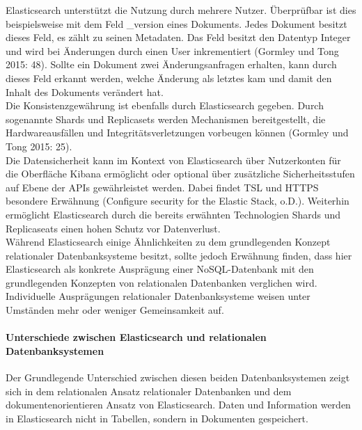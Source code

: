 \documentclass[a4paper]{scrartcl}
\begin{document}
Elasticsearch unterstützt die Nutzung durch mehrere Nutzer. Überprüfbar ist dies beispielsweise mit dem Feld \_version eines Dokuments. Jedes Dokument besitzt dieses Feld, es zählt zu seinen Metadaten. Das Feld besitzt den Datentyp Integer und wird bei Änderungen durch einen User inkrementiert (Gormley und Tong 2015: 48). Sollte ein Dokument zwei Änderungsanfragen erhalten, kann durch dieses Feld erkannt werden, welche Änderung als letztes kam und damit den Inhalt des Dokuments verändert hat. \\

Die Konsistenzgewährung ist ebenfalls durch Elasticsearch gegeben. Durch sogenannte Shards und Replicasets werden Mechanismen bereitgestellt, die Hardwareausfällen und Integritätsverletzungen vorbeugen können (Gormley und Tong 2015: 25). \\

Die Datensicherheit kann im Kontext von Elasticsearch über Nutzerkonten für die Oberfläche Kibana ermöglicht oder optional über zusätzliche Sicherheitsstufen auf Ebene der APIs gewährleistet werden. Dabei findet TSL und HTTPS besondere Erwähnung (Configure security for the Elastic Stack, o.D.). Weiterhin ermöglicht Elasticsearch durch die bereits erwähnten Technologien Shards und Replicaseats einen hohen Schutz vor Datenverlust. \\ 

Während Elasticsearch einige Ähnlichkeiten zu dem grundlegenden Konzept relationaler Datenbanksysteme besitzt, sollte jedoch Erwähnung finden, dass hier Elasticsearch als konkrete Ausprägung einer NoSQL-Datenbank mit den grundlegenden Konzepten von relationalen Datenbanken verglichen wird. Individuelle Ausprägungen relationaler Datenbanksysteme weisen unter Umständen mehr oder weniger Gemeinsamkeit auf.

\paragraph{Unterschiede zwischen Elasticsearch und relationalen Datenbanksystemen}
Der Grundlegende Unterschied zwischen diesen beiden Datenbanksystemen zeigt sich in dem relationalen Ansatz relationaler Datenbanken und dem dokumentenorientieren Ansatz von Elasticsearch. Daten und Information werden in Elasticsearch nicht in Tabellen, sondern in Dokumenten gespeichert. \\
\end{document}
